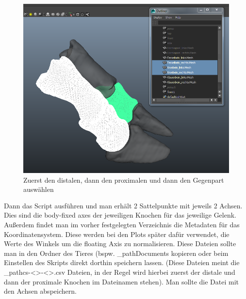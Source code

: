 \documentclass[a4paper, openany, oneside]{memoir}
\begin{document}
\begin{figure}
\begin{center}
\includegraphics[width = \textwidth, height = 0.4\textheight, keepaspectratio]{img_auswahl}
\caption{Zuerst den distalen, dann den proximalen und dann den Gegenpart auswählen}
\label{fig:auswahl}
\end{center}
\end{figure}

Dann das Script ausführen und man erhält 2 Sattelpunkte mit jeweils 2 Achsen. Dies sind die body-fixed axes der jeweiligen Knochen für das jeweilige Gelenk. Außerdem findet man im vorher festgelegten Verzeichnis die Metadaten für das Koordinatensystem. Diese werden bei den Plots später dafür verwendet, die Werte des Winkels um die floating Axis zu normalisieren. Diese Dateien sollte man in den Ordner des Tieres (bspw. \dir_path{Documents\ProKlaue\testdaten\achsen\ergebnisse\alma} kopieren oder beim Einstellen des Skripts direkt dorthin speichern lassen. (Diese Dateien meint die \File_path{cs-<>-<>.csv} Dateien, in der Regel wird hierbei zuerst der distale und dann der proximale Knochen im Dateinamen stehen). Man sollte die Datei mit den Achsen abspeichern.
\end{document}
